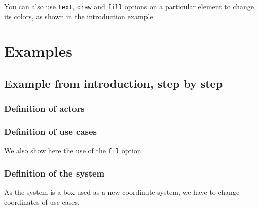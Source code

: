 \documentclass[a4paper,11pt]{report}
\begin{document}
You can also use {\tt text}, {\tt draw} and {\tt fill} options on a particular element to change its colors, as shown in the introduction example.

\section{Examples}

\subsection{Example from introduction, step by step}

\subsubsection{Definition of actors}

{\color{red!70!black}

}

\begin{center}
\end{center}

\subsubsection{Definition of use cases}

We also show here the use of the {\tt fil} option.

{\color{red!70!black}
\vspace{-0.4cm}
}


\begin{center}
\end{center}

\subsubsection{Definition of the system}

As the system is a box used as a new coordinate system, we have to change coordinates of use cases.

{\color{red!70!black}
\vspace{-0.4cm}
}
\vspace{-0.4cm}
{\color{red!70!black}
\vspace{-0.4cm}
}

\end{document}
